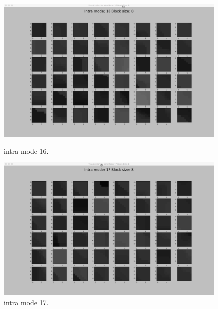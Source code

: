 \begin{figure}[H]

    \vspace*{1cm} %

    \begin{minipage}{0.49\textwidth}
        \includegraphics[width=\linewidth]{Figures/visu-size8x8/8-16}
        \caption[Intra mode 16]{intra mode 16.}
        \label{fig:size8_mode16}
    \end{minipage}
    \hspace{\fill} %
    \begin{minipage}{0.49\textwidth}
        \includegraphics[width=\linewidth]{Figures/visu-size8x8/8-17}
        \caption[Intra mode 17]{intra mode 17.}
        \label{fig:size8_mode17}
    \end{minipage}

    \vspace*{1cm} %


\end{figure}
